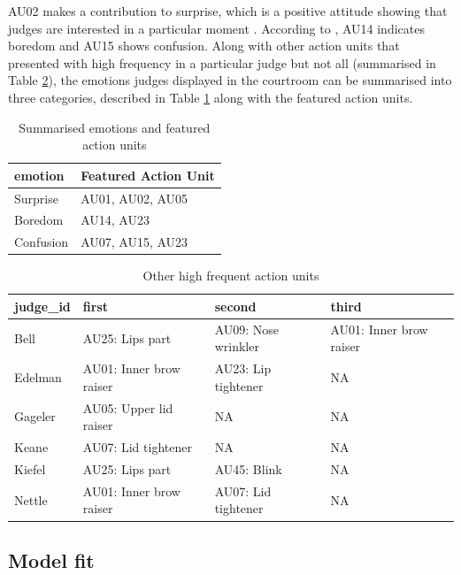 \documentclass{monashthesis}
\begin{document}
AU02 makes a contribution to surprise, which is a positive attitude showing that judges are interested in a particular moment \autocite{ekman2002facial}. According to \autocite{ekman2002facial}, AU14 indicates boredom and AU15 shows confusion. Along with other action units that presented with high frequency in a particular judge but not all (summarised in Table \ref{tab:other_highf}), the emotions judges displayed in the courtroom can be summarised into three categories, described in Table \ref{tab:three_category} along with the featured action units.

\begin{table}[t]

\caption{\label{tab:unnamed-chunk-6}\label{tab:three_category} Summarised emotions and featured action units}
\centering
\begin{tabular}{l|l}
\hline
emotion & Featured Action Unit\\
\hline
Surprise & AU01, AU02, AU05\\
\hline
Boredom & AU14, AU23\\
\hline
Confusion & AU07, AU15, AU23\\
\hline
\end{tabular}
\end{table}

\begin{table}[t]

\caption{\label{tab:unnamed-chunk-7}\label{tab:other_highf} Other high frequent action units }
\centering
\begin{tabular}{l|l|l|l}
\hline
judge\_id & first & second & third\\
\hline
Bell & AU25: Lips part & AU09: Nose wrinkler & AU01: Inner brow raiser\\
\hline
Edelman & AU01: Inner brow raiser & AU23: Lip tightener & NA\\
\hline
Gageler & AU05: Upper lid raiser & NA & NA\\
\hline
Keane & AU07: Lid tightener & NA & NA\\
\hline
Kiefel & AU25: Lips part & AU45: Blink & NA\\
\hline
Nettle & AU01: Inner brow raiser & AU07: Lid tightener & NA\\
\hline
\end{tabular}
\end{table}

\hypertarget{model-fit}{%
\subsection{Model fit}\label{model-fit}}
\end{document}
